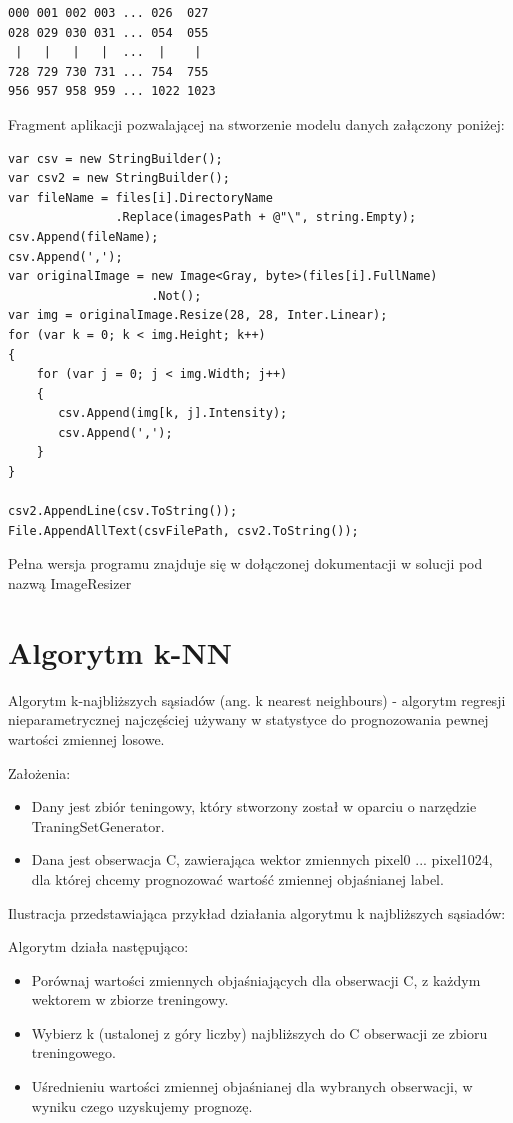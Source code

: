 \documentclass[brudnopis]{xmgr}
\begin{document}
\begin{lstlisting}
000 001 002 003 ... 026  027
028 029 030 031 ... 054  055
 |   |   |   |  ...  |    |
728 729 730 731 ... 754  755
956 957 958 959 ... 1022 1023 
\end{lstlisting} 

Fragment aplikacji pozwalającej na stworzenie modelu danych załączony poniżej:

\begin{lstlisting}
var csv = new StringBuilder();
var csv2 = new StringBuilder();
var fileName = files[i].DirectoryName
               .Replace(imagesPath + @"\", string.Empty);
csv.Append(fileName);
csv.Append(',');
var originalImage = new Image<Gray, byte>(files[i].FullName)
                    .Not();
var img = originalImage.Resize(28, 28, Inter.Linear);
for (var k = 0; k < img.Height; k++)
{
    for (var j = 0; j < img.Width; j++)
    {
       csv.Append(img[k, j].Intensity);
       csv.Append(',');
    }
}

csv2.AppendLine(csv.ToString());
File.AppendAllText(csvFilePath, csv2.ToString());
\end{lstlisting}

Pełna wersja programu znajduje się w dołączonej dokumentacji w solucji pod nazwą ImageResizer

\section{Algorytm k-NN}

Algorytm k-najbliższych sąsiadów (ang. k nearest neighbours) - algorytm regresji nieparametrycznej najczęściej używany w statystyce do prognozowania pewnej wartości zmiennej losowe.

Założenia:
\begin{itemize}
\item
Dany jest zbiór teningowy, który stworzony został w oparciu o narzędzie TraningSetGenerator.
\item
Dana jest obserwacja C, zawierająca wektor zmiennych pixel0 ... pixel1024, dla której chcemy prognozować wartość zmiennej objaśnianej label.
\end{itemize}	

   Ilustracja przedstawiająca przykład działania algorytmu k najbliższych sąsiadów:

Algorytm działa następująco:
\begin{itemize}
\item
Porównaj wartości zmiennych objaśniających dla obserwacji C, z każdym wektorem w zbiorze treningowy.
\item
Wybierz k (ustalonej z góry liczby) najbliższych do C obserwacji ze zbioru treningowego.
\item
Uśrednieniu wartości zmiennej objaśnianej dla wybranych obserwacji, w wyniku czego uzyskujemy prognozę.	
\end{itemize}	
     
\end{document}
